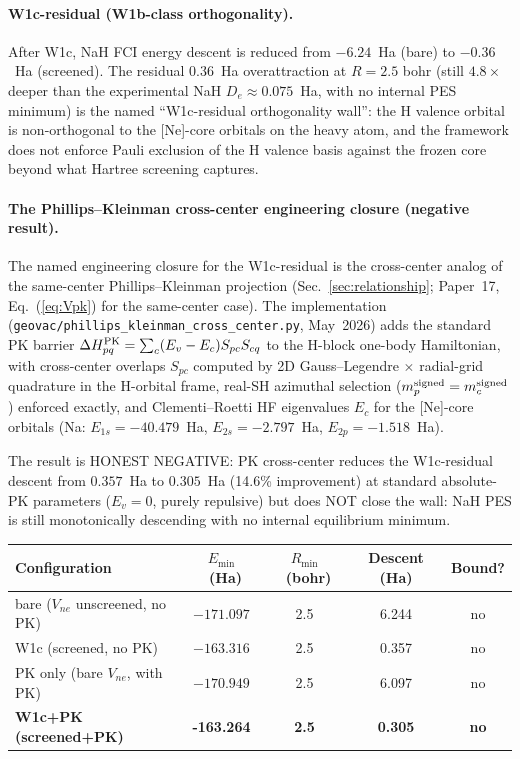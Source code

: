 \documentclass[aps,pra,twocolumn,superscriptaddress,longbibliography]{revtex4-2}
\begin{document}
\paragraph{W1c-residual (W1b-class orthogonality).}
After W1c, NaH FCI energy descent is reduced from
$-6.24$~Ha (bare) to $-0.36$~Ha (screened). The residual
$0.36$~Ha overattraction at $R = 2.5$ bohr (still $4.8\times$
deeper than the experimental NaH $D_e \approx 0.075$~Ha, with no
internal PES minimum) is the named ``W1c-residual orthogonality
wall'': the H valence orbital is non-orthogonal to the [Ne]-core
orbitals on the heavy atom, and the framework does not enforce
Pauli exclusion of the H valence basis against the frozen core
beyond what Hartree screening captures.

\paragraph{The Phillips--Kleinman cross-center engineering closure
(negative result).}
The named engineering closure for the W1c-residual is the
cross-center analog of the same-center Phillips--Kleinman
projection (Sec.~\ref{sec:relationship}; Paper~17,
Eq.~(\ref{eq:Vpk}) for the same-center case). The implementation
(\texttt{geovac/phillips\_kleinman\_cross\_center.py}, May~2026)
adds the standard PK barrier
$\Delta H_{pq}^{\rm PK} = \sum_c (E_v - E_c) S_{pc} S_{cq}$ to the
H-block one-body Hamiltonian, with cross-center overlaps $S_{pc}$
computed by 2D Gauss--Legendre $\times$ radial-grid quadrature
in the H-orbital frame, real-SH azimuthal selection
($m_p^{\rm signed} = m_c^{\rm signed}$) enforced exactly,
and Clementi--Roetti HF eigenvalues $E_c$ for the [Ne]-core
orbitals (Na: $E_{1s} = -40.479$~Ha, $E_{2s} = -2.797$~Ha,
$E_{2p} = -1.518$~Ha).

The result is HONEST NEGATIVE: PK cross-center reduces the
W1c-residual descent from $0.357$~Ha to $0.305$~Ha
(14.6\% improvement) at standard absolute-PK parameters
($E_v = 0$, purely repulsive) but does NOT close the wall:
NaH PES is still monotonically descending with no internal
equilibrium minimum.

\begin{center}
\begin{tabular}{lcccc}
\hline
Configuration & $E_{\min}$~(Ha) & $R_{\min}$~(bohr) & Descent (Ha) & Bound? \\
\hline
bare ($V_{ne}$ unscreened, no PK)        & $-171.097$ & 2.5 & 6.244 & no \\
W1c (screened, no PK)                    & $-163.316$ & 2.5 & 0.357 & no \\
PK only (bare $V_{ne}$, with PK)         & $-170.949$ & 2.5 & 6.097 & no \\
\textbf{W1c+PK (screened+PK)}            & \textbf{-163.264} & \textbf{2.5} & \textbf{0.305} & \textbf{no} \\
\hline
\end{tabular}
\end{center}
\end{document}
